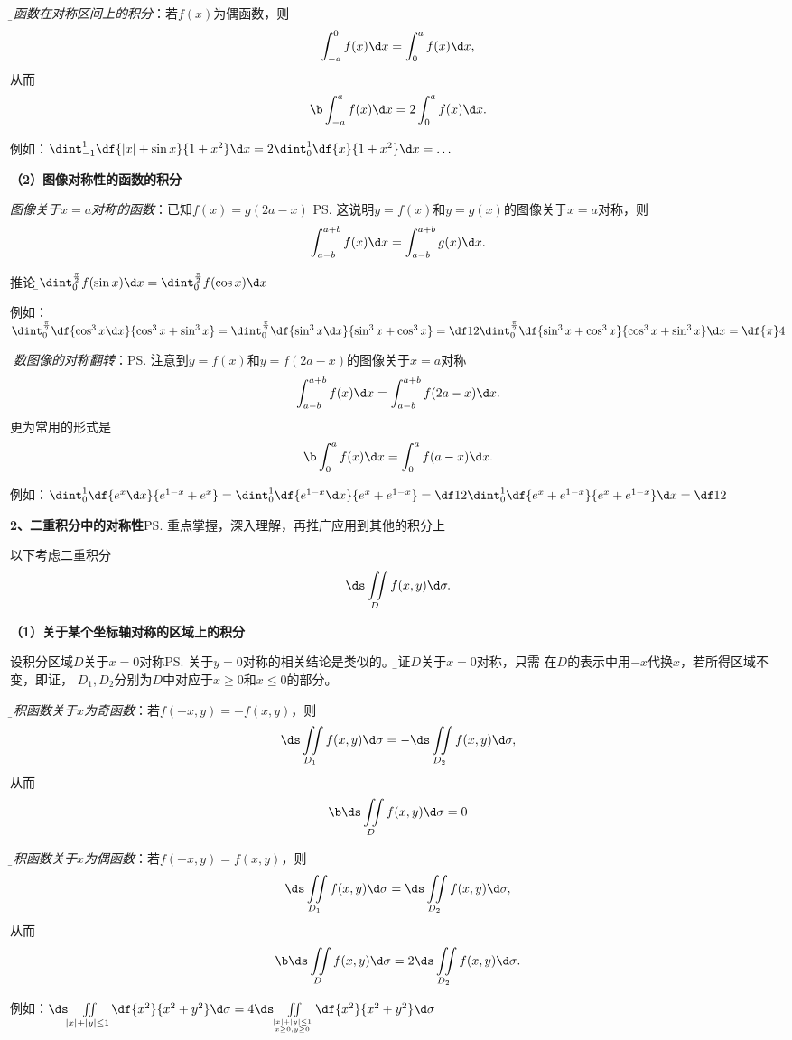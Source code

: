 {\it\b 偶函数在对称区间上的积分}：若$f(x)$为偶函数，则
$$\int_{-a}^0f(x)\d x=\int_0^af(x)\d x,$$
从而
$${\b \int_{-a}^af(x)\d x=2\int_0^af(x)\d x}.$$

例如：$\dint_{-1}^{1}\df{|x|+\sin x}{1+x^2}\d x
=2\dint_0^{1}\df{x}{1+x^2}\d x=\ldots$

{\bf （2）图像对称性的函数的积分}

{\it 图像关于$x=a$对称的函数}：已知$f(x)=g(2a-x)$
\ps{这说明$y=f(x)$和$y=g(x)$的图像关于$x=a$对称}，则
$$\int_{a-b}^{a+b}f(x)\d x=\int_{a-b}^{a+b}g(x)\d x.$$

推论：{\b $\dint_0^{\frac{\pi}2}f(\sin x)\d x=\dint_0^{\frac{\pi}2}f(\cos x)\d x$}

例如：$\dint_0^{\frac{\pi}2}\df{\cos^3x\d x}{\cos^3x+\sin^3x}
=\dint_0^{\frac{\pi}2}\df{\sin^3x\d x}{\sin^3x+\cos^3x}
=\df12\dint_0^{\frac{\pi}2}\df{\sin^3x+\cos^3x}{\cos^3x+\sin^3x}\d x=\df{\pi}4$

{\it\b 函数图像的对称翻转}：\ps{注意到$y=f(x)$和$y=f(2a-x)$的图像关于$x=a$对称}
$$\int_{a-b}^{a+b}f(x)\d x=\int_{a-b}^{a+b}f(2a-x)\d x.$$
更为常用的形式是
$${\b \int_0^af(x)\d x=\int_0^af(a-x)\d x}.$$

例如：$\dint_0^1\df{e^x\d x}{e^{1-x}+e^x}
=\dint_0^1\df{e^{1-x}\d x}{e^x+e^{1-x}}
=\df12\dint_0^1\df{e^x+e^{1-x}}{e^x+e^{1-x}}\d x=\df12$

\bigskip

{\bf 2、二重积分中的对称性}\ps{重点掌握，深入理解，再推广应用到其他的积分上}

以下考虑二重积分
$$\ds\iint\limits_Df(x,y)\d\sigma.$$

{\bf（1）关于某个坐标轴对称的区域上的积分}

设积分区域$D$关于$x=0$对称\ps{关于$y=0$对称的相关结论是类似的。\b 验证$D$关于$x=0$对称，只需
在$D$的表示中用$-x$代换$x$，若所得区域不变，即证}，
$D_1,D_2$分别为$D$中对应于$x\geq0$和$x\leq0$的部分。

{\it\b 被积函数关于$x$为奇函数}：若$f(-x,y)=-f(x,y)$，则
$$\ds\iint\limits_{D_1}f(x,y)\d\sigma=-\ds\iint\limits_{D_2}f(x,y)\d\sigma,$$
从而
$${\b \ds\iint\limits_{D}f(x,y)\d\sigma=0}$$

{\it\b 被积函数关于$x$为偶函数}：若$f(-x,y)=f(x,y)$，则
$$\ds\iint\limits_{D_1}f(x,y)\d\sigma=\ds\iint\limits_{D_2}f(x,y)\d\sigma,$$
从而
$${\b\ds\iint\limits_{D}f(x,y)\d\sigma=2\ds\iint\limits_{D_2}f(x,y)\d\sigma}.$$

例如：$\ds\iint\limits_{|x|+|y|\leq1}\df{x^2}{x^2+y^2}\d\sigma
=4\ds\iint\limits_{|x|+|y|\leq1\atop{x\geq0,y\geq0}}\df{x^2}{x^2+y^2}
\d\sigma$

